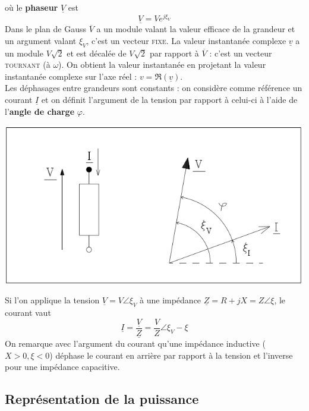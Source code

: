 	où le \textbf{phaseur} $\underline{V}$ est 
	\begin{equation}
	\underline{V} = Ve^{j\xi_V}
	\end{equation}
	Dans le plan de Gauss $\overline{V}$ a un module valant la valeur efficace 
	de la grandeur et un argument valant $\xi_V$, c'est un vecteur \textsc{fixe}.
	La valeur instantanée complexe $\underline{v}$ a un module $V\sqrt{2}$ et est 
	décalée de $V\sqrt{2}$ par rapport à $\overline{V}$ : c'est un vecteur 
	\textsc{tournant} (à $\omega$). On obtient la valeur instantanée en projetant 
	la valeur instantanée complexe sur l'axe réel : $v = \Re(\underline{v})$.\\
	
	Les déphasages entre grandeurs sont constants : on considère comme référence un 
	courant $\underline{I}$ et on définit l'argument de la tension par rapport à 
	celui-ci à l'aide de l'\textbf{angle de charge} $\varphi$.
	
	\begin{center}
	\includegraphics[scale=0.4]{ch1/image3.png}
	\end{center}	
		
	Si l'on applique la tension $\underline{V} = V\angle \xi_V$ à une impédance 
	$\underline{Z} = R + jX = Z\angle \xi$, le courant vaut 
	\begin{equation}
	\underline{I} = \frac{\underline{V}}{\underline{Z}} = \frac{V}{Z}\angle 
	\xi_V-\xi
	\end{equation}
	On remarque avec l'argument du courant qu'une impédance inductive ($X>0, 
	\xi <0$) déphase le courant en arrière par rapport à la tension et l'inverse 
	pour une impédance capacitive.
	
	
	\subsection{Représentation de la puissance}
